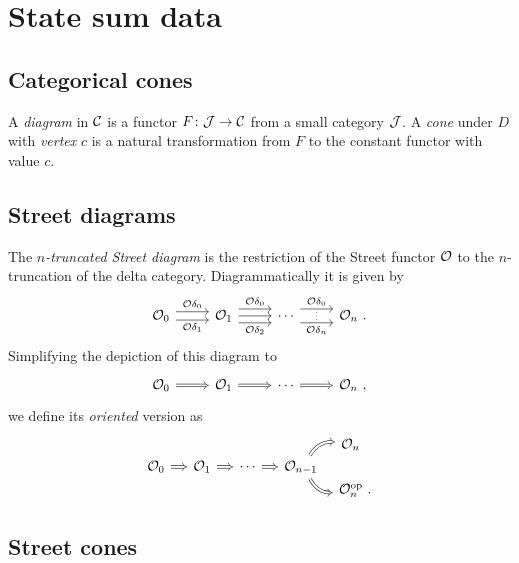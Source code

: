 
\section{State sum data}

\subsection{Categorical cones}

A \textit{diagram} in $\mathcal{C}$ is a functor $F \colon \mathcal{J} \to \mathcal{C}$ from a small category $\mathcal{J}$.
A \textit{cone} under $D$ with \textit{vertex} $c$ is a natural transformation from $F$ to the constant functor with value $c$.

\subsection{Street diagrams}

The \textit{$n$-truncated Street diagram} is the restriction of the Street functor $\mathcal{O}$ to the $n$-truncation of the delta category.
Diagrammatically it is given by
\[
\begin{tikzcd}
	\oriental_0
	\arrow[r,shift left=3pt, "\oriental{\delta_0}"] \arrow[r,shift right=3pt, "\oriental{\delta_1}"'] & \oriental_1
	\arrow[r,shift left=5pt, "\oriental{\delta_0}"] \arrow[r,shift right=5pt, "\oriental{\delta_2}"'] \rar &
	\dotsb
	\arrow[r,shift left=5pt, "\oriental{\delta_0}"] \arrow[r,shift right=5pt, "\oriental{\delta_n}"', "\scalebox{0.6}{$\vdots$}"] &
	\oriental_{n} \ .
\end{tikzcd}
\]
Simplifying the depiction of this diagram to
\[
\begin{tikzcd}
	\oriental_0
	\arrow[r, Rightarrow] & \oriental_1
	\arrow[r, Rightarrow] & \dotsb
	\arrow[r, Rightarrow] & \oriental_n \ ,
\end{tikzcd}
\]
we define its \textit{oriented} version as
\[
\begin{tikzcd}[column sep=small, row sep=0]
	& & & &[-5pt] \oriental_n \ \ \\
	\oriental_0
	\arrow[r, Rightarrow] & \oriental_1
	\arrow[r, Rightarrow] & \dotsb
	\arrow[r, Rightarrow] & \oriental_{n-1}
	\arrow[ur, Rightarrow, bend left] \arrow[dr, Rightarrow, bend right] & \\
	& & & & \oriental_n^\op \ .
\end{tikzcd}
\]

\subsection{Street cones}

